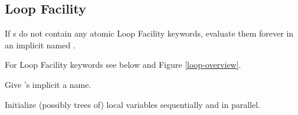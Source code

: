 \subsection{Loop Facility}
\label{section:Loop Facility}

\begin{LIST}{1cm}

  {
     If s do not contain any atomic Loop
    Facility keywords, evaluate them forever in an implicit 
    named \NIL.
  }

  {
     For Loop Facility keywords
    see below and Figure \ref{loop-overview}.
  }

  \begin{LIST}{.5cm}

    {
      Give 's implicit  a name.
    }

    {
      Initialize (possibly trees of) local variables 
      sequentially and  in parallel.
    }


\end{LIST}
\end{LIST}
